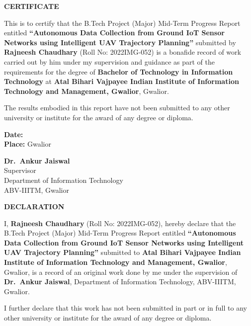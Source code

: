 \documentclass[12pt, a4paper, oneside]{report}
\newcommand{\IIITM}{Atal Bihari Vajpayee Indian Institute of Information Technology and Management, Gwalior}
\newcommand{\thesistitle}{Autonomous Data Collection from Ground IoT Sensor Networks using Intelligent UAV Trajectory Planning}
\newcommand{\authorname}{Rajneesh Chaudhary}
\newcommand{\rollno}{2022IMG-052}
\newcommand{\supervisor}{Dr.\ Ankur Jaiswal}
\newcommand{\department}{Department of Information Technology}
\begin{document}
\clearpage
\thispagestyle{plain}
\begin{center}
{\LARGE \textbf{CERTIFICATE}}
\end{center}
\vspace{1cm}

This is to certify that the B.Tech Project (Major) Mid-Term Progress Report entitled \textbf{``\thesistitle''} submitted by \textbf{\authorname} (Roll No: \rollno) is a bonafide record of work carried out by him under my supervision and guidance as part of the requirements for the degree of \textbf{Bachelor of Technology in Information Technology} at \textbf{\IIITM}, Gwalior.

\vspace{1cm}

The results embodied in this report have not been submitted to any other university or institute for the award of any degree or diploma.

\vspace{3cm}

\noindent
\begin{minipage}[t]{0.45\textwidth}
\textbf{Date:}\\
\textbf{Place:} Gwalior
\end{minipage}
\hfill
\begin{minipage}[t]{0.45\textwidth}
\raggedleft
\textbf{\supervisor}\\
Supervisor\\
\department\\
ABV-IIITM, Gwalior
\end{minipage}

\clearpage
\thispagestyle{plain}
\begin{center}
{\LARGE \textbf{DECLARATION}}
\end{center}
\vspace{1cm}

I, \textbf{\authorname} (Roll No: \rollno), hereby declare that the B.Tech Project (Major) Mid-Term Progress Report entitled \textbf{``\thesistitle''} submitted to \textbf{\IIITM}, Gwalior, is a record of an original work done by me under the supervision of \textbf{\supervisor}, \department, ABV-IIITM, Gwalior.

\vspace{0.5cm}

I further declare that this work has not been submitted in part or in full to any other university or institute for the award of any degree or diploma.
\end{document}
